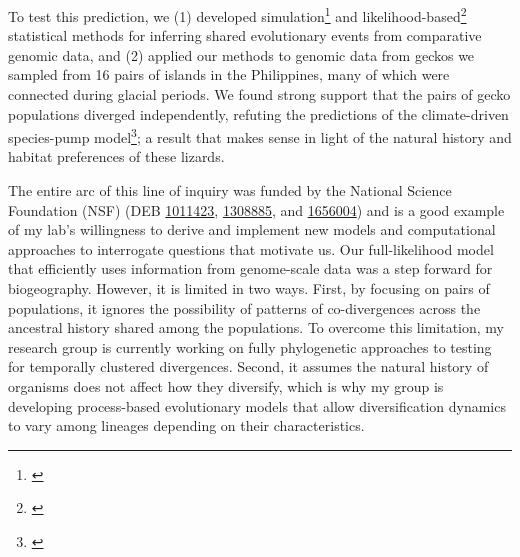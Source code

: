 To test this prediction, we
(1) developed
simulation\footnote{\label{Oaks14dpp}\hspace{-0.8em}}
and
likelihood-based\footnote{\label{Oaks18ecoevolity}\hspace{-0.8em}}
statistical methods for inferring shared evolutionary events from comparative
genomic data, and
(2) applied our methods to genomic data from geckos we sampled from 16 pairs of
islands in the Philippines, many of which were connected during glacial
periods.
We found strong support that the pairs of gecko populations diverged
independently,
refuting the predictions of the climate-driven species-pump
model\footnote{\label{Oaks18paic}\hspace{-0.8em}};
a result that makes sense in light of the natural history and habitat
preferences of these lizards.

The entire arc of this line of inquiry was funded by the National Science
Foundation (NSF)
(DEB
\href{https://www.nsf.gov/awardsearch/showAward?AWD_ID=1011423}{1011423},
\href{https://www.nsf.gov/awardsearch/showAward?AWD_ID=1308885}{1308885},
and
\href{https://www.nsf.gov/awardsearch/showAward?AWD_ID=1656004}{1656004})
and is a good example of my lab's willingness to derive and implement new
models and computational approaches to interrogate questions that motivate us.
Our full-likelihood model that efficiently uses information
from genome-scale data was a step forward for biogeography.
However,
it is limited in two ways.
First,
by focusing on pairs of populations, it ignores the possibility of patterns of
co-divergences across the ancestral history shared among the populations.
To overcome this limitation, my research group is currently working on fully
phylogenetic approaches to testing for temporally clustered divergences.
Second, it assumes the natural history of organisms does not affect how they
diversify, which is why my group is developing process-based evolutionary
models that allow diversification dynamics to vary among lineages depending on
their characteristics.

